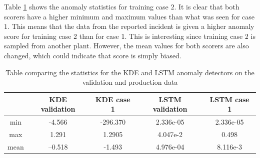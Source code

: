         Table \ref{tab:trainining_plant2_short_stats} shows the anomaly statistics for training case $2$. It is clear that both scorers have a higher minimum and maximum values than what was seen for case $1$. This means that the data from the reported incident is given a higher anomaly score for training case 2 than for case 1. This is interesting since training case 2 is sampled from another plant. However, the mean values for both scorers are also changed, which could indicate that score is simply biased. 
        \begin{table}[]
            \centering
            \begin{tabular}{|c|c|c|c|c|}
                \hline
                            & KDE validation  & KDE case 1     & LSTM validation     & LSTM case 1   \\ \hline
                min         & -4.566        & -296.370           & 2.336e-05            & 2.336e-05         \\ \hline
                max         & 1.291         & 1.2905             & 4.047e-2             & 0.498             \\ \hline
                mean        & --0.518       & -1.493             & 4.976e-04            & 8.116e-3          \\ \hline
            \end{tabular}
            \caption{Table comparing the statistics for the KDE and LSTM anomaly detectors on the validation and production data}
            \label{tab:trainining_plant2_short_stats}
        \end{table}
